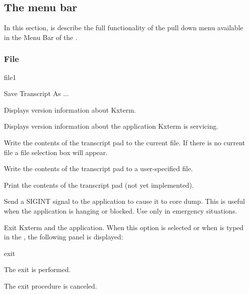 \subsection{The \EW{} menu bar}
In this section, is describe the full functionality of the pull down
menu available in the Menu Bar of the \EW.


\subsubsection{File}

\begin{PAWf}{file1}
\begin{DLsf}{Save Transcript As ...}
\item[About Kxterm...]
         Displays version information about Kxterm.
\item[About \lab Application\rab...]
         Displays version information about the application
         Kxterm is servicing.
\item[Save Transcript]
         Write the contents of the transcript pad to the current
         file. If there is no current file a file selection box
         will appear.
\item[Save Transcript As...]
         Write the contents of the transcript pad to a user-specified
         file.
\item[Print...]
         Print the contents of the transcript pad (not yet implemented).
\item[Kill]
         Send a SIGINT signal to the application to cause it to
         core dump. This is useful when the application is hanging or
         blocked. Use only in emergency situations.
\item[Exit]
         Exit Kxterm and the application. When this option is selected
         or when  is typed in the \IP, the following panel is 
         displayed:
\end{DLsf}
\end{PAWf}

\begin{PAWf}[.4]{exit}
\begin{EnumZB}
\item  The exit is performed.
\item  The exit procedure is canceled.
\end{EnumZB}
\end{PAWf}

